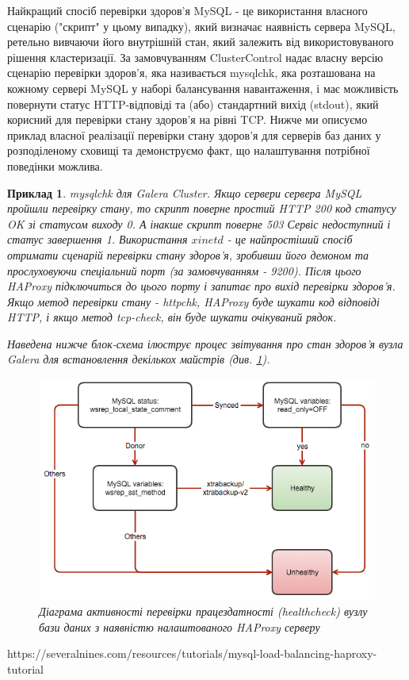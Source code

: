 \documentclass[14pt]{vakthesis}
\newtheorem{example}{Приклад}[chapter]
\begin{document}
Найкращий спосіб перевірки здоров'я MySQL - це використання власного сценарію ("скрипт" у цьому випадку), який визначає наявність сервера MySQL, ретельно вивчаючи його внутрішній стан, який залежить від використовуваного рішення кластеризації. За замовчуванням ClusterControl надає власну версію сценарію перевірки здоров'я, яка називається mysqlchk, яка розташована на кожному сервері MySQL у наборі балансування навантаження, і має можливість повернути статус HTTP-відповіді та (або) стандартний вихід (stdout), який корисний для перевірки стану здоров'я на рівні TCP.
Нижче ми описуємо приклад власної реалізації перевірки стану здоров'я для серверів баз даних у розподіленому сховищі та демонструємо факт, що налаштування потрібної поведінки можлива.
\begin{example} mysqlchk для Galera Cluster. Якщо сервери сервера MySQL пройшли перевірку стану, то скрипт поверне простий HTTP 200 код статусу OK зі статусом виходу 0. А інакше скрипт поверне 503 Сервіс недоступний і статус завершення 1.
Використання $xinetd$ - це найпростіший спосіб отримати сценарій перевірки стану здоров'я, зробивши його демоном та прослуховуючи спеціальний порт (за замовчуванням - 9200). Після цього HAProxy підключиться до цього порту і запитає про вихід перевірки здоров'я. Якщо метод перевірки стану - httpchk, HAProxy буде шукати код відповіді HTTP, і якщо метод tcp-check, він буде шукати очікуваний рядок.

Наведена нижче блок-схема ілюструє процес звітування про стан здоров'я вузла Galera для встановлення декількох майстрів (див. \ref{fig:mysqlchk}).

\begin{figure}
\centering
\includegraphics[width=\linewidth]{images/mysqlchk.png}
     \caption{Діаграма активності перевірки працездатності (healthcheck) вузлу бази даних з наявністю налаштованого HAProxy серверу}
     \label{fig:mysqlchk}
\end{figure}
\end{example}
https://severalnines.com/resources/tutorials/mysql-load-balancing-haproxy-tutorial
\end{document}
